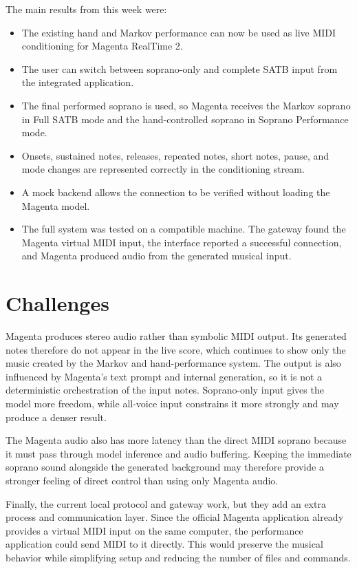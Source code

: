 \documentclass[11pt,a4paper]{article}
\begin{document}
The main results from this week were:

\begin{itemize}
    \item The existing hand and Markov performance can now be used as live MIDI
    conditioning for Magenta RealTime 2.
    \item The user can switch between soprano-only and complete SATB input from
    the integrated application.
    \item The final performed soprano is used, so Magenta receives the Markov
    soprano in Full SATB mode and the hand-controlled soprano in Soprano
    Performance mode.
    \item Onsets, sustained notes, releases, repeated notes, short notes, pause,
    and mode changes are represented correctly in the conditioning stream.
    \item A mock backend allows the connection to be verified without loading
    the Magenta model.
    \item The full system was tested on a compatible machine. The gateway found
    the Magenta virtual MIDI input, the interface reported a successful
    connection, and Magenta produced audio from the generated musical input.
\end{itemize}

\section{Challenges}

Magenta produces stereo audio rather than symbolic MIDI output. Its generated
notes therefore do not appear in the live score, which continues to show only
the music created by the Markov and hand-performance system. The output is also
influenced by Magenta's text prompt and internal generation, so it is not a
deterministic orchestration of the input notes. Soprano-only input gives the
model more freedom, while all-voice input constrains it more strongly and may
produce a denser result.

The Magenta audio also has more latency than the direct MIDI soprano because it
must pass through model inference and audio buffering. Keeping the immediate
soprano sound alongside the generated background may therefore provide a
stronger feeling of direct control than using only Magenta audio.

Finally, the current local protocol and gateway work, but they add an extra
process and communication layer. Since the official Magenta application
already provides a virtual MIDI input on the same computer, the performance
application could send MIDI to it directly. This would preserve the musical
behavior while simplifying setup and reducing the number of files and commands.
\end{document}
